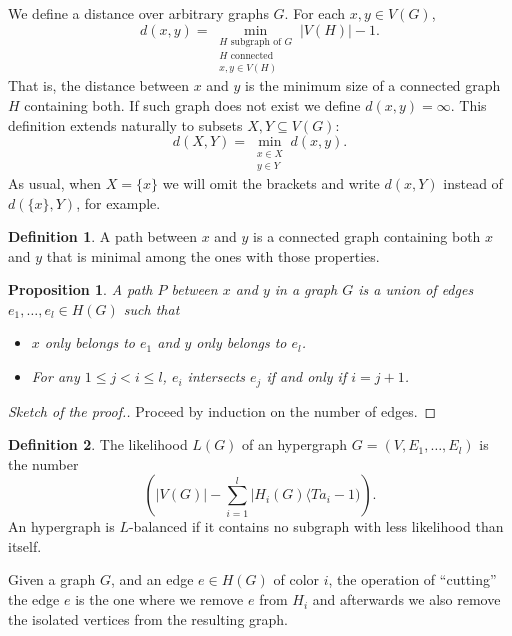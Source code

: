 \documentclass[11pt,notitlepage]{report}
\newtheorem{proposition}{Proposition}[chapter]
\theoremstyle{definition}
\newtheorem{definition}{Definition}[chapter]
\begin{document}
We define a distance over arbitrary graphs $G$. For each $x, y\in V(G)$,
\[ d(x,y)= \min_{\substack{H \text{ subgraph of } G\\ 
H \text{ connected }\\
x,y\in V(H)}} |V(H)| - 1 .\]
That is, the distance between $x$ and $y$ is the minimum size
of a connected graph $H$ containing both. 
If such graph does not exist we define $d(x,y)=\infty$.
This definition extends naturally to subsets $X,Y\subseteq V(G)$:
\[ d(X,Y)=\min_{\substack{x\in X\\ y\in Y}} d(x,y).\]
As usual, when $X=\{x\}$ we will omit the brackets and write
$d(x,Y)$ instead of $d(\{x\},Y)$, for example.  \par

\begin{definition} 
	A path between $x$ and $y$ is a connected graph containing both 
	$x$ and $y$	that is minimal among the ones with those properties. 
\end{definition}

\begin{proposition}\label{prop:pathform}
	A path $P$ between $x$ and $y$ in a graph $G$ is a union of 
	edges $e_1,\dots, e_l\in H(G)$ such that
	\begin{itemize}
		\item $x$ only belongs to
		$e_1$ and $y$ only belongs to $e_l$.
		\item For any $1\leq j < i\leq l$, $e_i$ intersects
		$e_j$ if and only if $i=j+1$.
	\end{itemize}  	
\end{proposition}
\begin{proof}[Sketch of the proof.]
	Proceed by induction on the number of edges.
\end{proof}

\begin{definition}
	The likelihood $L(G)$ of an hypergraph $G=(V,E_1,\dots,E_l)$ is
	the number
	\[ \left( |V(G)| - \sum_{i=1}^l |H_i(G)\langle Ta_i-1)\right).\]
	An hypergraph is $L$-balanced if it contains no subgraph with
	less likelihood than itself. 
\end{definition}

Given a graph $G$, and an edge $e\in H(G)$ of color $i$,
the operation of ``cutting'' the edge $e$ is the one where we remove 
$e$ from $H_i$ and afterwards we also remove the isolated 
vertices from the resulting graph.
\end{document}
